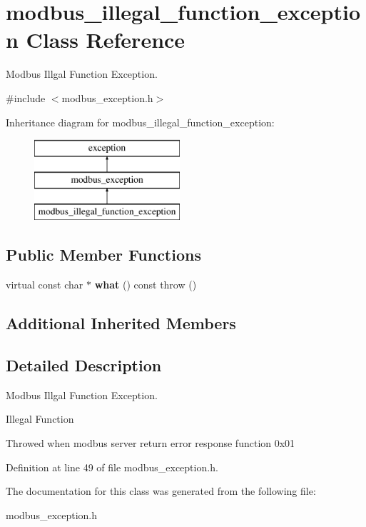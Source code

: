 \hypertarget{classmodbus__illegal__function__exception}{}\section{modbus\+\_\+illegal\+\_\+function\+\_\+exception Class Reference}
\label{classmodbus__illegal__function__exception}


Modbus Illgal Function Exception.  




{\ttfamily \#include $<$modbus\+\_\+exception.\+h$>$}

Inheritance diagram for modbus\+\_\+illegal\+\_\+function\+\_\+exception\+:\begin{figure}[H]
\begin{center}
\leavevmode
\includegraphics[height=3.000000cm]{classmodbus__illegal__function__exception}
\end{center}
\end{figure}
\subsection*{Public Member Functions}
\begin{DoxyCompactItemize}
\item 
\mbox{\label{classmodbus__illegal__function__exception_a97a9690c23ef372018206539d70c8fbd}} 
virtual const char $\ast$ {\bfseries what} () const  throw ()
\end{DoxyCompactItemize}
\subsection*{Additional Inherited Members}


\subsection{Detailed Description}
Modbus Illgal Function Exception. 

Illegal Function

Throwed when modbus server return error response function 0x01 

Definition at line 49 of file modbus\+\_\+exception.\+h.



The documentation for this class was generated from the following file\+:\begin{DoxyCompactItemize}
\item 
modbus\+\_\+exception.\+h\end{DoxyCompactItemize}
